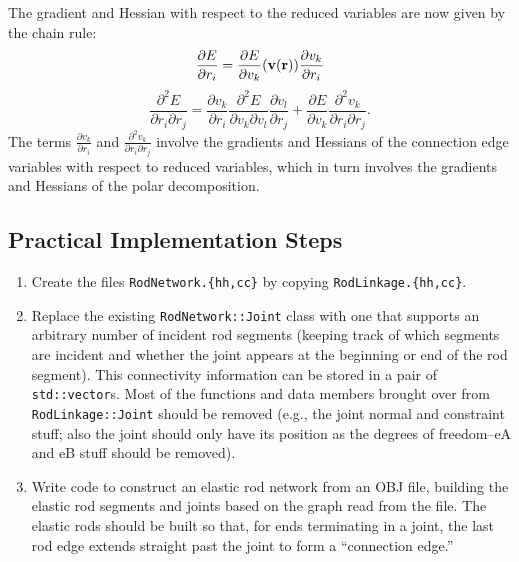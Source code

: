 \documentclass[10pt]{article}
\providecommand{\pder}[2]{\frac{\partial #1}{\partial #2}}
\providecommand{\spder}[3]{\frac{\partial^2 #1}{\partial #2 \partial #3}}
\renewcommand{\vec}[1]{{\bf #1}}
\def\r{\vec{r}}
\def\v{\vec{v}}
\begin{document}
The gradient and Hessian with respect to the reduced variables are now given by the chain rule:
$$
\pder{E}{r_i} = \pder{E}{v_k}(\v(\r)) \pder{v_k}{r_i}
$$
$$
\spder{E}{r_i}{r_j} =
\pder{v_k}{r_i} \spder{E}{v_k}{v_l} \pder{v_l}{r_j}
+
\pder{E}{v_k} \spder{v_k}{r_i}{r_j}.
$$
The terms $\pder{v_k}{r_i}$ and $\spder{v_k}{r_i}{r_j}$ involve the gradients
and Hessians of the connection edge variables with respect to reduced
variables, which in turn involves the gradients and Hessians of the polar
decomposition.

\subsection{Practical Implementation Steps}
\begin{enumerate}
    \item Create the files \texttt{RodNetwork.\{hh,cc\}} by copying \texttt{RodLinkage.\{hh,cc\}}.
    \item Replace the existing \texttt{RodNetwork::Joint} class with one that supports an
        arbitrary number of incident rod segments (keeping track of which
        segments are incident and whether the joint appears at the beginning or
        end of the rod segment). This connectivity information can be stored in
        a pair of \texttt{std::vector}s. Most of the functions and data members
        brought over from \texttt{RodLinkage::Joint} should be removed (e.g.,
        the joint normal and constraint stuff; also the joint should only have
        its position as the degrees of freedom--eA and eB stuff should be
        removed).
    \item Write code to construct an elastic rod network from an OBJ file,
        building the elastic rod segments and joints based on the graph read from the file.
        The elastic rods should be built so that, for ends terminating in a
        joint, the last rod edge extends straight past the joint to form a
        ``connection edge.''


\end{enumerate}
\end{document}
